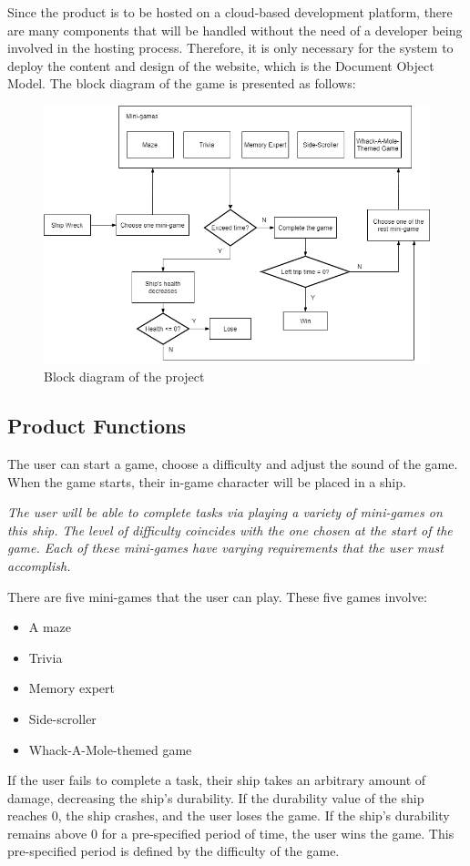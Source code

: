 \documentclass[]{article}
\begin{document}
Since the product is to be hosted on a cloud-based development platform, there are many components that will be handled without the need of a developer being involved in the hosting process. Therefore, it is only necessary for the system to deploy the content and design of the website, which is the Document Object Model. The block diagram of the game is presented as follows:
\newpage
\begin{figure}[H]
    \centering
    \includegraphics[width=1\textwidth]{figures/BlockDiagram.png}
    \caption{Block diagram of the project}
\end{figure}


\subsection{Product Functions}
\label{sub:product_functions}
The user can start a game, choose a difficulty and adjust the sound of the game. When the game starts, their in-game character will be placed in a ship. 

\bigskip
\textit{The user will be able to complete tasks via playing a variety of mini-games on this ship. The level of difficulty coincides with the one chosen at the start of the game. Each of these mini-games have varying requirements that the user must accomplish.}
\bigskip 

There are five mini-games that the user can play. These five games involve:
\begin{itemize}
    \item A maze
    \item Trivia
    \item Memory expert
    \item Side-scroller
    \item Whack-A-Mole-themed game
\end{itemize}
If the user fails to complete a task, their ship takes an arbitrary amount of damage, decreasing the ship's durability. If the durability value of the ship reaches 0, the ship crashes, and the user loses the game. If the ship's durability remains above 0 for a pre-specified period of time, the user wins the game. This pre-specified period is defined by the difficulty of the game.
\end{document}
